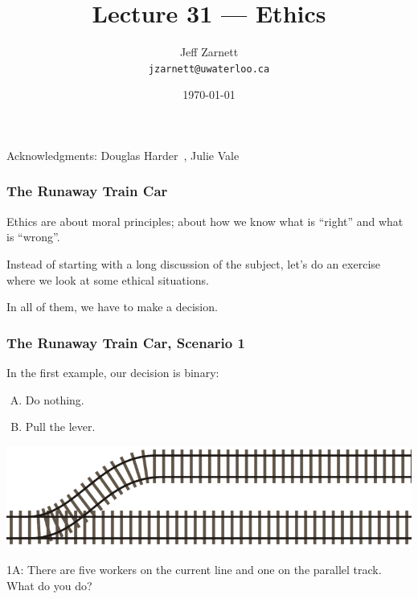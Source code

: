 

\title{Lecture 31 --- Ethics }

\author{Jeff Zarnett \\ \small \texttt{jzarnett@uwaterloo.ca}}
\date{\today}




\begin{frame}
  \titlepage

\begin{center}
  \small{Acknowledgments: Douglas Harder~\cite{dwh}, Julie Vale~\cite{jv}}
  \end{center}
\end{frame}



\begin{frame}
\frametitle{The Runaway Train Car}

Ethics are about moral principles; about how we know what is ``right'' and what is ``wrong''. 

Instead of starting with a long discussion of the subject, let's do an exercise where we look at some ethical situations. 

In all of them, we have to make a decision.

\end{frame}



\begin{frame}
\frametitle{The Runaway Train Car, Scenario 1}


In the first example, our decision is binary:\\

\begin{enumerate}[A.]
	\item Do nothing.
	\item Pull the lever.
\end{enumerate}

\begin{center}
	\includegraphics[width=\textwidth]{images/crazytrain}
\end{center}


1A: There are five workers on the current line and one on the parallel track.\\
\quad What do you do?

\end{frame}

